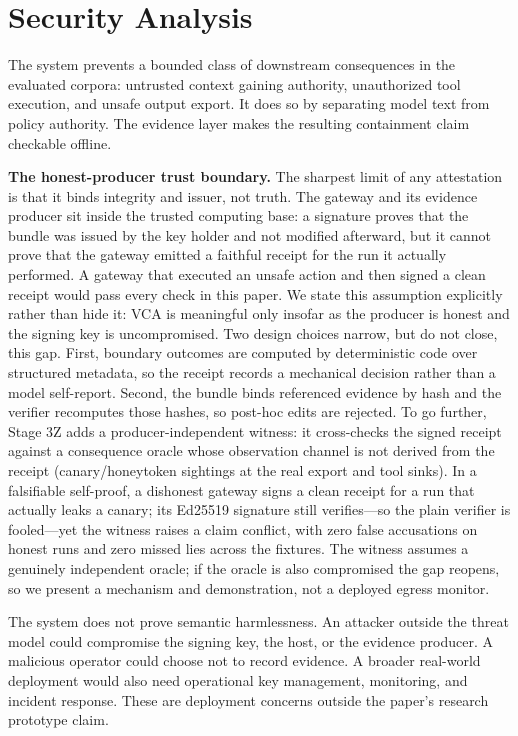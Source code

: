 \documentclass[sigconf,anonymous,review]{acmart}
\begin{document}
\section{Security Analysis}

The system prevents a bounded class of downstream consequences in the evaluated corpora: untrusted context gaining authority, unauthorized tool execution, and unsafe output export. It does so by separating model text from policy authority. The evidence layer makes the resulting containment claim checkable offline.

\textbf{The honest-producer trust boundary.} The sharpest limit of any attestation is that it binds integrity and issuer, not truth. The gateway and its evidence producer sit inside the trusted computing base: a signature proves that the bundle was issued by the key holder and not modified afterward, but it cannot prove that the gateway emitted a faithful receipt for the run it actually performed. A gateway that executed an unsafe action and then signed a clean receipt would pass every check in this paper. We state this assumption explicitly rather than hide it: VCA is meaningful only insofar as the producer is honest and the signing key is uncompromised. Two design choices narrow, but do not close, this gap. First, boundary outcomes are computed by deterministic code over structured metadata, so the receipt records a mechanical decision rather than a model self-report. Second, the bundle binds referenced evidence by hash and the verifier recomputes those hashes, so post-hoc edits are rejected. To go further, Stage 3Z adds a producer-independent witness: it cross-checks the signed receipt against a consequence oracle whose observation channel is not derived from the receipt (canary/honeytoken sightings at the real export and tool sinks). In a falsifiable self-proof, a dishonest gateway signs a clean receipt for a run that actually leaks a canary; its Ed25519 signature still verifies---so the plain verifier is fooled---yet the witness raises a claim conflict, with zero false accusations on honest runs and zero missed lies across the fixtures. The witness assumes a genuinely independent oracle; if the oracle is also compromised the gap reopens, so we present a mechanism and demonstration, not a deployed egress monitor.

The system does not prove semantic harmlessness. An attacker outside the threat model could compromise the signing key, the host, or the evidence producer. A malicious operator could choose not to record evidence. A broader real-world deployment would also need operational key management, monitoring, and incident response. These are deployment concerns outside the paper's research prototype claim.
\end{document}
